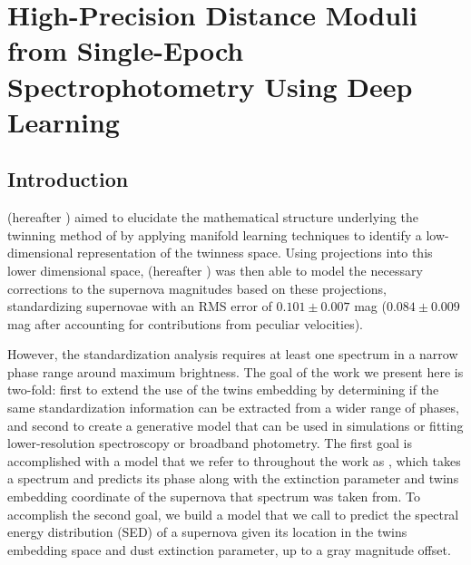\chapter{High-Precision Distance Moduli from Single-Epoch Spectrophotometry Using Deep Learning}
\label{chap:nn_twins}

\section{Introduction}
\label{sec:nn_twins_intro}
\citet{boone_twins_2020a} (hereafter ) aimed to elucidate the mathematical structure underlying the twinning method of \citet{fakhouri_improving_2015} by applying manifold learning techniques to identify a low-dimensional representation of the twinness space. Using projections into this lower dimensional space, \citet{boone_twins_2020b} (hereafter ) was then able to model the necessary corrections to the supernova magnitudes based on these projections, standardizing supernovae with an RMS error of $0.101 \pm 0.007$ mag ($0.084 \pm 0.009$ mag after accounting for contributions from peculiar velocities).

However, the  standardization analysis requires at least one spectrum in a narrow phase range around maximum brightness. The goal of the work we present here is two-fold: first to extend the use of the twins embedding by determining if the same standardization information can be extracted from a wider range of phases, and second to create a generative model that can be used in simulations or fitting lower-resolution spectroscopy or broadband photometry. The first goal is accomplished with a model that we refer to throughout the work as \stoe, which takes a spectrum and predicts its phase along with the extinction parameter and twins embedding coordinate of the supernova that spectrum was taken from. To accomplish the second goal, we build a model that we call \etos{} to predict the spectral energy distribution (SED) of a supernova given its location in the twins embedding space and dust extinction parameter, up to a gray magnitude offset.

